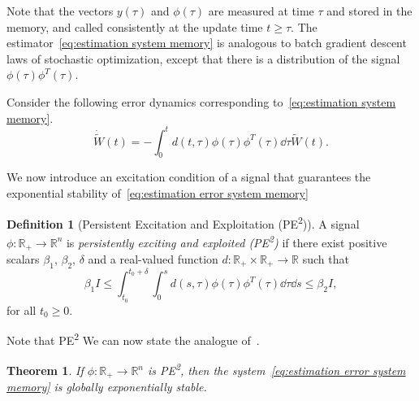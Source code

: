 \documentclass[]{IEEEtran}
\newtheorem{theorem}{Theorem}
\theoremstyle{definition}
\newtheorem{definition}{Definition}
\theoremstyle{remark}
\newcommand{\MB}[1]{\mathbb{#1}}
\newcommand{\tsup}[1]{\textsuperscript{#1}}
\begin{document}
Note that the vectors $y(\tau)$ and $\phi(\tau)$ are measured at time $\tau$ and
stored in the memory, and called consistently at the update time $t \ge \tau$.
The estimator~\eqref{eq:estimation system memory} is analogous to batch
gradient descent laws of stochastic optimization, except that there is a
distribution of the signal $\phi(\tau) \phi^T(\tau)$.

Consider the following error dynamics corresponding to~\eqref{eq:estimation
system memory}.
\begin{equation}\label{eq:estimation error system memory}
	\dot{\tilde{W}}(t) = - \int_0^t d(t, \tau) \phi(\tau) \phi^T(\tau) \dd{\tau}
	\tilde{W}(t).
\end{equation}

We now introduce an excitation condition of a signal that guarantees the
exponential stability of~\eqref{eq:estimation error system memory}

\begin{definition}[Persistent Excitation and Exploitation
	(PE\tsup{2})]
	A signal $\phi: \MB{R}_{+} \to \MB{R}^n$ is \textit{persistently exciting and
	exploited (PE\tsup{2})} if there exist positive scalars $\beta_1$, $\beta_2$,
	$\delta$ and a real-valued function $d : \MB{R}_{+} \times \MB{R}_{+} \to
	\MB{R}$ such that
	\begin{equation}\label{eq:PE2}
		\beta_1 I \le \int_{t_0}^{t_0+\delta} \int_{0}^s d(s, \tau) \phi(\tau)
		\phi^T(\tau) \dd{\tau} \dd{s} \le \beta_2 I,
	\end{equation}
	for all $t_0 \ge 0$.
\end{definition}

Note that PE\tsup{2}
We can now state the analogue of~\cite[Theorem~1]{anderson_exponential_1977}.

\begin{theorem}\label{thm:PE2 then GES}
	If $\phi: \MB{R}_{+} \to \MB{R}^n$ is PE\tsup{2}, then the
	system~\eqref{eq:estimation error system memory} is globally exponentially
	stable.
\end{theorem}
\end{document}
